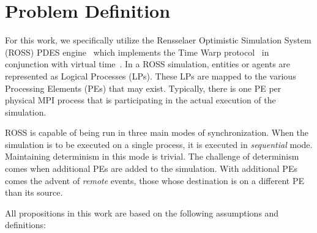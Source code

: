 \documentclass[nonacm,sigconf]{acmart}
\begin{document}



\section{Problem Definition}
For this work, we specifically utilize the Rensselaer Optimistic Simulation System (ROSS) PDES engine~\cite{carothers2000,carothers2002} which implements the Time Warp protocol~\cite{jefferson1985fast,jefferson1987,jefferson1987time} in conjunction with virtual time~\cite{jefferson1985}. In a ROSS simulation, entities or agents are represented as Logical Processes (LPs). These LPs are mapped to the various Processing Elements (PEs) that may exist. Typically, there is one PE per physical MPI process that is participating in the actual execution of the simulation.

ROSS is capable of being run in three main modes of synchronization. When the simulation is to be executed on a single process, it is executed in \emph{sequential} mode. Maintaining determinism in this mode is trivial. The challenge of determinism comes when additional PEs are added to the simulation. With additional PEs comes the advent of \emph{remote} events, those whose destination is on a different PE than its source. 


All propositions in this work are based on the following assumptions and definitions:

\end{document}
